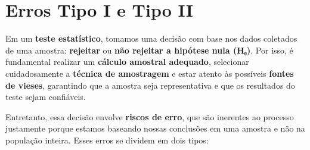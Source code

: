 \documentclass[
]{book}
\begin{document}
\section{Erros Tipo I e Tipo II}\label{erros-tipo-i-e-tipo-ii}

Em um \textbf{teste estatístico}, tomamos uma decisão com base nos dados coletados de uma amostra: \textbf{rejeitar} ou \textbf{não rejeitar a hipótese nula (H₀)}. Por isso, é fundamental realizar um \textbf{cálculo amostral adequado}, selecionar cuidadosamente a \textbf{técnica de amostragem} e estar atento às possíveis \textbf{fontes de vieses}, garantindo que a amostra seja representativa e que os resultados do teste sejam confiáveis.

Entretanto, essa decisão envolve \textbf{riscos de erro}, que são inerentes ao processo justamente porque estamos baseando nossas conclusões em uma amostra e não na população inteira. Esses erros se dividem em dois tipos:
\end{document}
